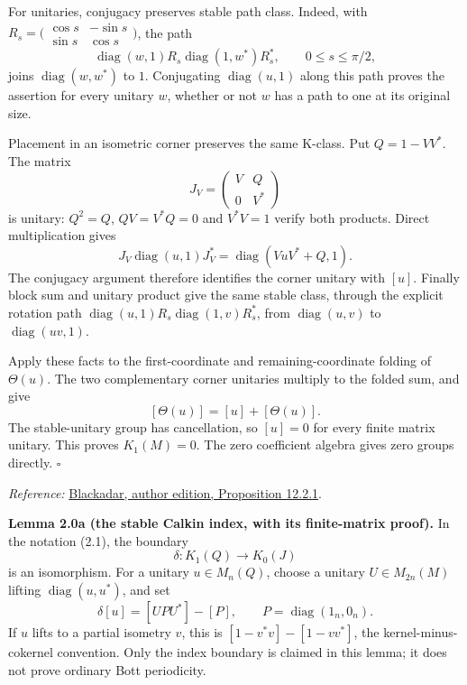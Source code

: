 \documentclass[
  11pt,
]{article}
\begin{document}
For unitaries, conjugacy preserves stable path class. Indeed, with
\(R_s=\bigl(\begin{smallmatrix}\cos s&-\sin s\\\sin s&\cos s\end{smallmatrix}\bigr)\),
the path \[
\operatorname{diag}(w,1)R_s\operatorname{diag}(1,w^*)R_s^*,
\qquad0\leq s\leq\pi/2,
\] joins \(\operatorname{diag}(w,w^*)\) to \(1\). Conjugating
\(\operatorname{diag}(u,1)\) along this path proves the assertion for
every unitary \(w\), whether or not \(w\) has a path to one at its
original size.

Placement in an isometric corner preserves the same K-class. Put
\(Q=1-VV^*\). The matrix \[
J_V=\begin{pmatrix}V&Q\\0&V^*\end{pmatrix}
\] is unitary: \(Q^2=Q\), \(QV=V^*Q=0\) and \(V^*V=1\) verify both
products. Direct multiplication gives \[
J_V\operatorname{diag}(u,1)J_V^*
=\operatorname{diag}(VuV^*+Q,1).
\] The conjugacy argument therefore identifies the corner unitary with
\([u]\). Finally block sum and unitary product give the same stable
class, through the explicit rotation path
\(\operatorname{diag}(u,1)R_s\operatorname{diag}(1,v)R_s^*\), from
\(\operatorname{diag}(u,v)\) to \(\operatorname{diag}(uv,1)\).

Apply these facts to the first-coordinate and remaining-coordinate
folding of \(\Theta(u)\). The two complementary corner unitaries
multiply to the folded sum, and give \[
[\Theta(u)]=[u]+[\Theta(u)].
\] The stable-unitary group has cancellation, so \([u]=0\) for every
finite matrix unitary. This proves \(K_1(M)=0\). The zero coefficient
algebra gives zero groups directly. \(\square\)

\emph{Reference:}
\href{https://www.bruceblackadar.com/Mathematics/book6.pdf}{Blackadar,
author edition, Proposition 12.2.1}.

\textbf{Lemma 2.0a (the stable Calkin index, with its finite-matrix
proof).} In the notation (2.1), the boundary \[
\delta:K_1(Q)\longrightarrow K_0(J)
\] is an isomorphism. For a unitary \(u\in M_n(Q)\), choose a unitary
\(U\in M_{2n}(M)\) lifting \(\operatorname{diag}(u,u^*)\), and set \[
\delta[u]=[UPU^*]-[P],\qquad P=\operatorname{diag}(1_n,0_n).
\] If \(u\) lifts to a partial isometry \(v\), this is
\([1-v^*v]-[1-vv^*]\), the kernel-minus-cokernel convention. Only the
index boundary is claimed in this lemma; it does not prove ordinary Bott
periodicity.
\end{document}
